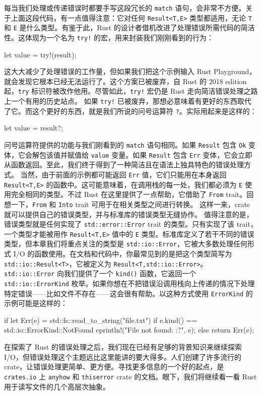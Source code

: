 \label{idx:idx_d2b4136c}
\label{idx:idx_03b3cdce}
每当我们处理或传递错误时都要手写这段冗长的 \texttt{match} 语句，会非常不方便。关于上面这段代码，有一点值得注意：它对任何 \texttt{Result<T,E>} 类型都适用，无论 \texttt{T} 和 \texttt{E} 是什么类型。有鉴于此，Rust 的设计者借机改进了处理错误所需代码的简洁性。这体现为一个名为 \texttt{try!} 的宏，用来封装我们刚刚看到的行为：
\begin{codebox}[rust]
let value = try!(result);
\end{codebox}
这大大减少了处理错误的工作量，但如果我们把这个示例输入 Rust Playground，就会发现它根本已经无法运行了。这个方案已被废弃，自 Rust 的 2018 edition 起，\texttt{try} 标识符被改作他用。尽管如此，\texttt{try!} 宏仍是 Rust 走向简洁错误处理之路上一个有用的历史站点。
如果 \texttt{try!} 已被废弃，那想必意味着有更好的东西取代了它。而这个更好的东西，就是我们所说的问号运算符 \texttt{?}。实际用起来是这样的：
\begin{codebox}[rust]
let value = result?;
\end{codebox}
问号运算符提供的功能与我们刚看到的 \texttt{match} 语句相同。如果 \texttt{Result} 包含 \texttt{Ok} 变体，它会解包该值并赋值给 \texttt{value} 变量。如果 \texttt{Result} 包含 \texttt{Err} 变体，它会立即从函数返回。至此，我们终于得到了一种简洁且在语法上独具特色的错误处理方式。
当然，由于前面的示例都可能返回 \texttt{Err} 值，它们只能用在本身返回 \texttt{Result<T,E>} 的函数中。这可能意味着，在调用栈的每一处，我们都必须为 \texttt{E} 使用完全相同的类型。不过 Rust 在这里提供了一点帮助，它借助了
\texttt{From} trait。回想一下，\texttt{From} 和 \texttt{Into} trait 可用于在相关类型之间进行转换。
\label{idx:idx_468c5109}
这样一来，crate 就可以提供自己的错误类型，并与标准库的错误类型无缝协作。
\label{idx:idx_c0b6c2ff}
\label{idx:idx_15c53426}
值得注意的是，错误类型就是任何实现了 \texttt{std::\allowbreak{}error::\allowbreak{}Error} trait 的类型。只有实现了该 trait，一个类型才能被用作 \texttt{Result<T,E>} 值中的 \texttt{E} 类型。标准库定义了若干不同的错误类型，但本章我们将重点关注的类型是 \texttt{std::\allowbreak{}io::\allowbreak{}Error}，它被大多数处理任何形式 I/\allowbreak{}O 的函数使用。在文档和代码中，你最常见到的是把这个类型简写为 \texttt{std::\allowbreak{}io::\allowbreak{}Result<\allowbreak{}T>\allowbreak{}}，它被定义为 \texttt{Result<\allowbreak{}T,\allowbreak{}std::\allowbreak{}io::\allowbreak{}Error>\allowbreak{}}。
\texttt{std::\allowbreak{}io::\allowbreak{}Error} 向我们提供了一个 \texttt{kind()} 函数，它返回一个 \texttt{std::\allowbreak{}io::\allowbreak{}ErrorKind} 枚举。如果你想在不把错误沿调用栈向上传递的情况下处理特定错误——比如文件不存在——这会很有帮助。以这种方式使用 \texttt{ErrorKind} 的示例可能是这样的：
\begin{codebox}[rust]
if let Err(e) = std::fs::read_to_string("file.txt") {
    if e.kind() == std::io::ErrorKind::NotFound {
        eprintln!("File not found: {:?}", e);
    } else {
        return Err(e);
    }
}
\end{codebox}
\label{idx:idx_ebbafd32}
在探索了 Rust 的错误处理之后，我们现在已经有足够的背景知识来继续探索 I/\allowbreak{}O，但错误处理这个主题远比这里能讲的要大得多。人们创建了许多流行的 crate，让错误处理更简单、更方便。寻找更多信息的一个好的起点，是 \texttt{crates.io} 上 \texttt{anyhow} 和 \texttt{thiserror} crate 的文档。眼下，我们将继续看一看 Rust 用于读写文件的几个高层次抽象。
